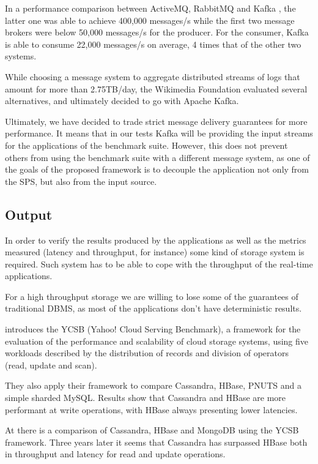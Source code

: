 \documentclass[ppgc,diss,english]{iiufrgs}
\begin{document}
In a performance comparison between ActiveMQ, RabbitMQ and Kafka \cite{kreps2011kafka}, the latter one was able to achieve 400,000 messages/s while the first two message brokers were below 50,000 messages/s for the producer. For the consumer, Kafka is able to consume 22,000 messages/s on average, 4 times that of the other two systems.

While choosing a message system to aggregate distributed streams of logs that amount for more than 2.75TB/day, the Wikimedia Foundation evaluated \cite{Wikimedia:2014} several alternatives, and ultimately decided to go with Apache Kafka.

Ultimately, we have decided to trade strict message delivery guarantees for more performance. It means that in our tests Kafka will be providing the input streams for the applications of the benchmark suite. However, this does not prevent others from using the benchmark suite with a different message system, as one of the goals of the proposed framework is to decouple the application not only from the SPS, but also from the input source.

\subsection{Output}

In order to verify the results produced by the applications as well as the metrics measured (latency and throughput, for instance) some kind of storage system is required. Such system has to be able to cope with the throughput of the real-time applications.

For a high throughput storage we are willing to lose some of the guarantees of traditional DBMS, as most of the applications don't have deterministic results.

\cite{cooper2010benchmarking} introduces the YCSB (Yahoo! Cloud Serving Benchmark), a framework for the evaluation of the performance and scalability of cloud storage systems, using five workloads described by the distribution of records and division of operators (read, update and scan).

They also apply their framework to compare Cassandra, HBase, PNUTS and a simple sharded MySQL. Results show that Cassandra and HBase are more performant at write operations, with HBase always presenting lower latencies. 

At \cite{Datastax:2013} there is a comparison of Cassandra, HBase and MongoDB using the YCSB framework. Three years later it seems that Cassandra has surpassed HBase both in throughput and latency for read and update operations.
\end{document}
